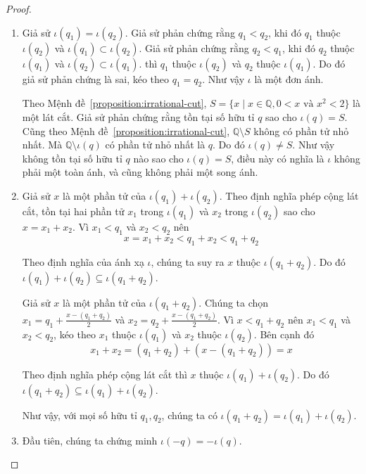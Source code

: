 \begin{proof}
    \begin{enumerate}[label={(\roman*)}]
        \item Giả sử $\iota(q_{1}) = \iota(q_{2})$. Giả sử phản chứng rằng $q_{1} < q_{2}$, khi đó $q_{1}$ thuộc $\iota(q_{2})$ và $\iota(q_{1})\subset \iota(q_{2})$. Giả sử phản chứng rằng $q_{2} < q_{1}$, khi đó $q_{2}$ thuộc $\iota(q_{1})$ và $\iota(q_{2})\subset \iota(q_{1})$. thì $q_{1}$ thuộc $\iota(q_{2})$ và $q_{2}$ thuộc $\iota(q_{1})$. Do đó giả sử phản chứng là sai, kéo theo $q_{1} = q_{2}$. Như vậy $\iota$ là một đơn ánh.

              Theo Mệnh đề~\ref{proposition:irrational-cut}, $S = \{ x \mid x\in\mathbb{Q}, 0 < x \text{ và } x^{2} < 2 \}$ là một lát cắt. Giả sử phản chứng rằng tồn tại số hữu tỉ $q$ sao cho $\iota(q) = S$. Cũng theo Mệnh đề~\ref{proposition:irrational-cut}, $\mathbb{Q}\setminus S$ không có phần tử nhỏ nhất. Mà $\mathbb{Q}\setminus\iota(q)$ có phần tử nhỏ nhất là $q$. Do đó $\iota(q)\ne S$. Như vậy không tồn tại số hữu tỉ $q$ nào sao cho $\iota(q) = S$, điều này có nghĩa là $\iota$ không phải một toàn ánh, và cũng không phải một song ánh.

        \item Giả sử $x$ là một phần tử của $\iota(q_{1}) + \iota(q_{2})$. Theo định nghĩa phép cộng lát cắt, tồn tại hai phần tử $x_{1}$ trong $\iota(q_{1})$ và $x_{2}$ trong $\iota(q_{2})$ sao cho $x = x_{1} + x_{2}$. Vì $x_{1} < q_{1}$ và $x_{2} < q_{2}$ nên
              \[
                  x = x_{1} + x_{2} < q_{1} + x_{2} < q_{1} + q_{2}
              \]

              Theo định nghĩa của ánh xạ $\iota$, chúng ta suy ra $x$ thuộc $\iota(q_{1} + q_{2})$. Do đó $ \iota(q_{1}) + \iota(q_{2}) \subseteq \iota(q_{1} + q_{2})$.

              Giả sử $x$ là một phần tử của $\iota(q_{1} + q_{2})$. Chúng ta chọn $x_{1} = q_{1} + \frac{x - (q_{1} + q_{2})}{2}$ và $x_{2} = q_{2} + \frac{x - (q_{1} + q_{2})}{2}$. Vì $x < q_{1} + q_{2}$ nên $x_{1} < q_{1}$ và $x_{2} < q_{2}$, kéo theo $x_{1}$ thuộc $\iota(q_{1})$ và $x_{2}$ thuộc $\iota(q_{2})$. Bên cạnh đó
              \[
                  x_{1} + x_{2} = (q_{1} + q_{2}) + (x - (q_{1} + q_{2})) = x
              \]

              Theo định nghĩa phép cộng lát cắt thì $x$ thuộc $\iota(q_{1}) + \iota(q_{2})$. Do đó $\iota(q_{1} + q_{2}) \subseteq \iota(q_{1}) + \iota(q_{2})$.

              Như vậy, với mọi số hữu tỉ $q_{1}, q_{2}$, chúng ta có $ \iota(q_{1} + q_{2}) = \iota(q_{1}) + \iota(q_{2})$.
        \item Đầu tiên, chúng ta chứng minh $\iota(-q) = -\iota(q)$.


\end{enumerate}
\end{proof}
